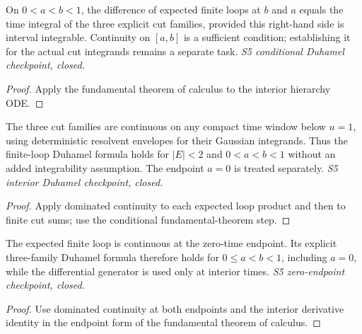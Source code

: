 \begin{lemma}
  \label{lem:loop-hierarchy-integral}
  \leanok
  On $0<a<b<1$, the difference of expected finite loops at $b$ and $a$
  equals the time integral of the three explicit cut families, provided
  this right-hand side is interval integrable. Continuity on $[a,b]$ is
  a sufficient condition; establishing it for the actual cut integrands
  remains a separate task. \emph{S5 conditional Duhamel checkpoint, closed.}
\end{lemma}
\begin{proof}\leanok
  Apply the fundamental theorem of calculus to the interior hierarchy ODE.
\end{proof}

\begin{lemma}
  \label{lem:loop-hierarchy-cut-continuity}
  \leanok
  The three cut families are continuous on any compact time window below
  $u=1$, using deterministic resolvent envelopes for their Gaussian
  integrands. Thus the finite-loop Duhamel formula holds for
  $|E|<2$ and $0<a<b<1$ without an added integrability assumption.
  The endpoint $a=0$ is treated separately.
  \emph{S5 interior Duhamel checkpoint, closed.}
\end{lemma}
\begin{proof}\leanok
  Apply dominated continuity to each expected loop product and then to
  finite cut sums; use the conditional fundamental-theorem step.
\end{proof}

\begin{lemma}
  \label{lem:loop-hierarchy-integral-zero}
  \leanok
  The expected finite loop is continuous at the zero-time endpoint. Its
  explicit three-family Duhamel formula therefore holds for
  $0\leq a<b<1$, including $a=0$, while the differential generator is
  used only at interior times. \emph{S5 zero-endpoint checkpoint, closed.}
\end{lemma}
\begin{proof}\leanok
  Use dominated continuity at both endpoints and the interior derivative
  identity in the endpoint form of the fundamental theorem of calculus.
\end{proof}

